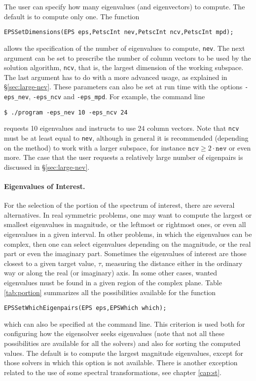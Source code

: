 The user can specify how many eigenvalues (and eigenvectors) to compute. The default is to compute only one. The function
        \begin{Verbatim}[fontsize=\small]
        EPSSetDimensions(EPS eps,PetscInt nev,PetscInt ncv,PetscInt mpd);
        \end{Verbatim}
allows the specification of the number of eigenvalues to compute, \texttt{nev}. The next argument can be set to prescribe the number of column vectors to be used by the solution algorithm, \texttt{ncv}, that is, the largest dimension of the working subspace. The last argument has to do with a more advanced usage, as explained in \S\ref{sec:large-nev}. These parameters can also be set at run time with the options \Verb!-eps_nev!, \Verb!-eps_ncv! and \Verb!-eps_mpd!. For example, the command line
\begin{Verbatim}[fontsize=\small]
        $ ./program -eps_nev 10 -eps_ncv 24
\end{Verbatim}
requests 10 eigenvalues and instructs to use 24 column vectors. Note that \texttt{ncv} must be at least equal to \texttt{nev}, although in general it is recommended (depending on the method) to work with a larger subspace, for instance $\mathtt{ncv}\geq2\cdot\mathtt{nev}$ or even more. The case that the user requests a relatively large number of eigenpairs is discussed in \S\ref{sec:large-nev}.

\paragraph{Eigenvalues of Interest.}

For the selection of the portion of the spectrum of interest, there are several alternatives. In real symmetric problems, one may want to compute the largest or smallest eigenvalues in magnitude, or the leftmost or rightmost ones, or even all eigenvalues in a given interval. In other problems, in which the eigenvalues can be complex, then one can select eigenvalues depending on the magnitude, or the real part or even the imaginary part. Sometimes the eigenvalues of interest are those closest to a given target value, $\tau$, measuring the distance either in the ordinary way or along the real (or imaginary) axis. In some other cases, wanted eigenvalues must be found in a given region of the complex plane. Table \ref{tab:portion} summarizes all the possibilities available for the function
        \begin{Verbatim}[fontsize=\small]
        EPSSetWhichEigenpairs(EPS eps,EPSWhich which);
        \end{Verbatim}
which can also be specified at the command line. This criterion is used both for configuring how the eigensolver seeks eigenvalues (note that not all these possibilities are available for all the solvers) and also for sorting the computed values. The default is to compute the largest magnitude eigenvalues, except for those solvers in which this option is not available. There is another exception related to the use of some spectral transformations, see chapter \ref{cap:st}.

